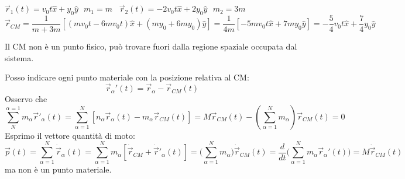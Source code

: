 \begin{example}
    $\vec{r}_1(t) = v_0 t \hat{x} + y_0 \hat{y} \:\:\: m_1 = m \hspace{10pt} \vec{r}_2(t) = -2v_0 t \hat{x} + 2y_0 \hat{y} \:\:\: m_2 = 3m$
    $$\vec{r}_{CM} = \frac{1}{m + 3m}[(mv_0t - 6mv_0t)\hat{x} + (my_0 + 6my_0)\hat{y}] = \frac{1}{4m}[-5mv_0t\hat{x} + 7my_0 \hat{y}] = -\frac{5}{4} v_0t\hat{x} + \frac{7}{4}y_0\hat{y}$$
\end{example}
\begin{observation}
    Il CM non è un punto fisico, può trovare fuori dalla regione spaziale occupata dal sistema.
\end{observation}
Posso indicare ogni punto materiale con la posizione relativa al CM:
$$\vec{r}_{\alpha}'(t) = \vec{r}_{\alpha} - \vec{r}_{CM}(t)$$
Osservo che 
$$\sum_{N}^{\alpha = 1}m_{\alpha}\vec{r}'_{\alpha}(t) = \sum_{\alpha = 1}^{N}[n_{\alpha}\vec{r}_{\alpha}(t) - m_{\alpha}\vec{r}_{CM}(t)] = M\vec{r}_{CM}(t) - (\sum_{\alpha = 1}^{N}m_{\alpha})\vec{r}_{CM}(t) = 0$$
Esprimo il vettore quantità di moto:
$$\vec{p}(t) = \sum_{\alpha = 1}^{N}\dot{\vec{r}}_{\alpha}(t) = \sum_{\alpha = 1}^{N}m_{\alpha}[\dot{\vec{r}}_{CM} + \dot{\vec{r}}'_{\alpha}(t)]
= \Big(\sum_{\alpha = 1}^{N}m_{\alpha}\Big)\dot{\vec{r}}_{CM}(t) = \frac{d}{dt} \Big(\sum_{\alpha=1}^{N}m_{\alpha}\vec{r}_{\alpha}'(t)\Big) = M\dot{\vec{r}}_{CM}(t)
$$
ma non è un punto materiale.